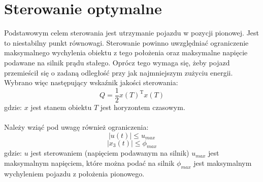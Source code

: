 \section{Sterowanie optymalne}
\label{sec:sterowanie_optymalne}

Podstawowym celem sterowania jest utrzymanie pojazdu w pozycji pionowej. Jest to niestabilny punkt równowagi. Sterowanie powinno uwzględniać ograniczenie maksymalnego wychylenia obiektu z tego położenia oraz maksymalne napięcie podawane na silnik prądu stałego. Oprócz tego wymaga się, żeby pojazd przemieścił się o zadaną odległość przy jak najmniejszym zużyciu energii. Wybrano więc następujący wskaźnik jakości sterowania:
\begin{equation}
Q=\frac{1}{2}x(T)^\text{T}x(T)
\end{equation}
\noindent gdzie:\newline
\(x\) jest stanem obiektu\newline
\(T\) jest horyzontem czasowym.

\paragraph*{}
Należy wziąć pod uwagę również ograniczenia:
\begin{equation}
|u(t)|\leqslant u_{max}
\label{eq:u_max}
\end{equation}
\begin{equation}
|x_3(t)|\leqslant \phi_{max}
\label{eq:phi_max}
\end{equation}
\noindent gdzie:\newline
\(u\) jest sterowaniem (napięciem podawanym na silnik)\newline
\(u_{max}\) jest maksymalnym napięciem, które można podać na silnik\newline
\(\phi_{max}\) jest maksymalnym wychyleniem pojazdu z położenia pionowego.

